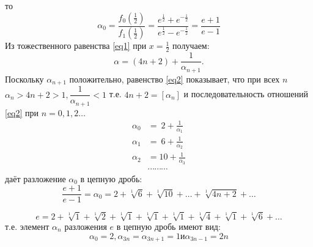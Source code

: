 \documentclass{book}
\begin{document}
то
\begin{equation*}
	\alpha_{0}=\frac{f_{0}(\frac{1}{2})}{f_{1}(\frac{1}{2})}=\frac{e^{\frac{1}{2}}+e^{-\frac{1}{2}}}{e^\frac{1}{2}-e^{-\frac{1}{2}}}=\frac{e+1}{e-1}
\end{equation*}
Из тожественного равенства \eqref{eq1} при $x=\frac{1}{2}$ получаем:
\begin{equation} \label{eq2} 
	\alpha=(4n+2)+\frac{1}{\alpha_{n+1}}. 
\end{equation}
Поскольку $\alpha_{n+1}$ положительно, равенство \eqref{eq2} показывает, что при всех $n$ $\alpha_{n}>4n+2>1,\dfrac{1}{\alpha_{n+1}}<1$ т.е. $4n+2=[\alpha_{n}]$ и последовательность отношений \eqref{eq2} при $n=0,1,2\ldots$
\begin{equation*}
	\begin{split}
		\alpha_{0}&=\ 2+\frac{1}{\alpha_{1}}\\
		\alpha_{1}&=\ 6+\frac{1}{\alpha_{2}}\\
		\alpha_{2}&=10+\frac{1}{\alpha_{3}}\\
		&\dotsb\dotsb\dotsb
		\end{split}
\end{equation*}
даёт разложение $\alpha_{0}$ в цепную дробь:
\begin{equation}\label{eq3}
	\frac{e+1}{e-1}=\alpha_{0}=2+\sqrt[1]{6}+\sqrt[1]{10}+\ldots+\sqrt[1]{4n+2}+\ldots
\end{equation}
\begin{theorem}
	\begin{equation}
	e=2+\sqrt[1]{1}+\sqrt[1]{2}+\sqrt[1]{1}+\sqrt[1]{1}+\sqrt[1]{1}+\sqrt[1]{4}+\sqrt[1]{1}+\sqrt[1]{6}+\ldots \label{eq44}
\end{equation}
	т.е. элемент $\alpha_{n}$ разложения $e$ в цепную дробь	имеют вид:
	\begin{equation*}
		\alpha_{0}=2,\alpha_{3n}=\alpha_{3n+1}=1\text{и} \alpha_{3n-1}=2n 
	\end{equation*}
\end{theorem}
\end{document}
